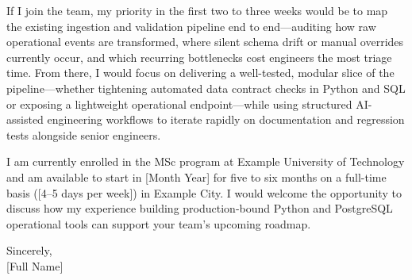 If I join the team, my priority in the first two to three weeks would be to map the existing ingestion and validation pipeline end to end—auditing how raw operational events are transformed, where silent schema drift or manual overrides currently occur, and which recurring bottlenecks cost engineers the most triage time. From there, I would focus on delivering a well-tested, modular slice of the pipeline—whether tightening automated data contract checks in Python and SQL or exposing a lightweight operational endpoint—while using structured AI-assisted engineering workflows to iterate rapidly on documentation and regression tests alongside senior engineers.

I am currently enrolled in the MSc program at Example University of Technology and am available to start in [Month Year] for five to six months on a full-time basis ([4--5 days per week]) in Example City. I would welcome the opportunity to discuss how my experience building production-bound Python and PostgreSQL operational tools can support your team's upcoming roadmap.

\vspace{0.6em}
Sincerely,\\[0.8em]
[Full Name]
